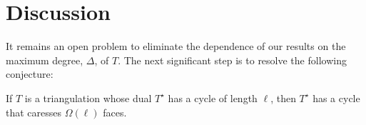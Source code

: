 \documentclass[a4paper,UKenglish]{socg-lipics-v2019}
\newcommand{\dual}[1]{{#1}^\star}
\begin{document}


\section{Discussion}


It remains an open problem to eliminate the dependence of our results
on the maximum degree, $\Delta$, of $T$.  The next significant step
is to resolve the following conjecture:

\begin{conj}
  If $T$ is a triangulation whose dual $\dual{T}$ has a cycle of length
  $\ell$, then $\dual{T}$ has a cycle that caresses $\Omega(\ell)$ faces.
\end{conj}





\end{document}
